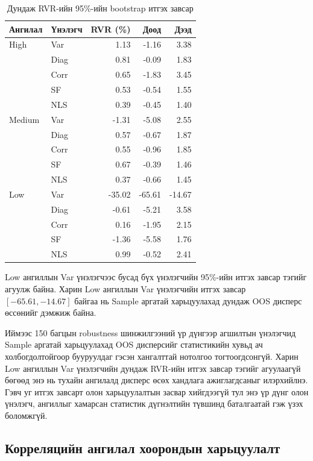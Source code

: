 \begin{table}[htbp]
	\centering
	\caption{Дундаж RVR-ийн 95\%-ийн bootstrap итгэх завсар}
	\label{tab:bootstrap_rvr}
	\small
	\begin{tabular}{llrrr}
		\hline
		Ангилал & Үнэлэгч &
		RVR (\%) & Доод & Дээд\\
		\hline
		High & Var  & 1.13 & -1.16 & 3.38\\
		& Diag & 0.81 & -0.09 & 1.83\\
		& Corr & 0.65 & -1.83 & 3.45\\
		& SF   & 0.53 & -0.54 & 1.55\\
		& NLS  & 0.39 & -0.45 & 1.40\\
		\hline
		Medium & Var  & -1.31 & -5.08 & 2.55\\
		& Diag & 0.57 & -0.67 & 1.87\\
		& Corr & 0.55 & -0.96 & 1.85\\
		& SF   & 0.67 & -0.39 & 1.46\\
		& NLS  & 0.37 & -0.66 & 1.45\\
		\hline
		Low & Var  & -35.02 & -65.61 & -14.67\\
		& Diag & -0.61 & -5.21 & 3.58\\
		& Corr & 0.16 & -1.95 & 2.15\\
		& SF   & -1.36 & -5.58 & 1.76\\
		& NLS  & 0.99 & -0.52 & 2.41\\
		\hline
	\end{tabular}
\end{table}

Low ангиллын Var үнэлэгчээс бусад
бүх үнэлэгчийн 95\%-ийн итгэх завсар
тэгийг агуулж байна. Харин Low
ангиллын Var үнэлэгчийн итгэх завсар
$[-65.61,-14.67]$ байгаа нь Sample
аргатай харьцуулахад дундаж OOS
дисперс өссөнийг дэмжиж байна.

Иймээс 150 багцын robustness шинжилгээний үр дүнгээр агшилтын үнэлэгчид Sample аргатай харьцуулахад OOS дисперсийг статистикийн хувьд ач холбогдолтойгоор бууруулдаг гэсэн хангалттай нотолгоо тогтоогдсонгүй. Харин Low ангиллын Var үнэлэгчийн дундаж RVR-ийн итгэх завсар тэгийг агуулаагүй бөгөөд энэ нь тухайн ангилалд дисперс өсөх хандлага ажиглагдсаныг илэрхийлнэ. Гэвч уг итгэх завсарт олон харьцуулалтын засвар хийгдээгүй тул энэ үр дүнг олон үнэлэгч, ангиллыг хамарсан статистик дүгнэлтийн түвшинд баталгаатай гэж үзэх боломжгүй.

\subsection{Корреляцийн ангилал хоорондын харьцуулалт}
\label{subsec:tier_comparison_results}

